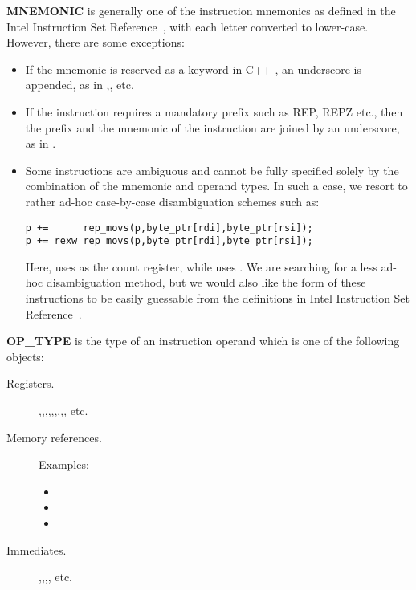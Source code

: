\documentclass{article}
\begin{document}
{\bf MNEMONIC} is generally one of the instruction mnemonics as
defined in the Intel Instruction Set Reference~\cite{intel:insn_ref},
with each letter converted to lower-case. However, there are some
exceptions:
\begin{itemize}
\item If the mnemonic is reserved as a keyword in C++ , an underscore
  is appended, as in ,, etc.
\item If the instruction requires a mandatory prefix such as
  REP, REPZ etc., then the prefix and the mnemonic of the
  instruction are joined by an underscore, as in .
\item Some instructions are ambiguous and cannot be fully specified
  solely by the combination of the mnemonic and operand types. In such
  a case, we resort to rather ad-hoc case-by-case disambiguation
  schemes such as:
\begin{lstlisting}[frame=single]
p +=      rep_movs(p,byte_ptr[rdi],byte_ptr[rsi]);
p += rexw_rep_movs(p,byte_ptr[rdi],byte_ptr[rsi]);    
\end{lstlisting}
  Here,  uses  as the count register, while  uses .
  We are searching for a less ad-hoc disambiguation method, but we would also
  like the form of these instructions to be easily guessable from the definitions
  in Intel Instruction Set Reference~\cite{intel:insn_ref}.
\end{itemize}

{\bf OP{\_}TYPE} is the type of an instruction operand
which is one of the following objects:
\begin{description}
\item[Registers.] ,,,,,,,,, etc.
\item[Memory references.]  Examples:
  \begin{itemize}
  \item  {}
  \item  {}
  \item  {}
  \end{itemize}

\item[Immediates.] ,,,, etc. 
\end{description}
\end{document}
